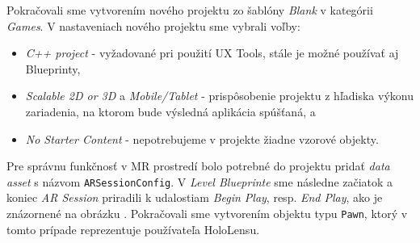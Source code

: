 Pokračovali sme vytvorením nového projektu zo šablóny \emph{Blank} v kategórii \emph{Games}. V nastaveniach nového projektu sme vybrali voľby:
\begin{itemize}
  \item \emph{C++ project} - vyžadované pri použití UX Tools, stále je možné používať aj Blueprinty,
  \item \emph{Scalable 2D or 3D} a \emph{Mobile/Tablet} - prispôsobenie projektu z hľadiska výkonu zariadenia, na ktorom bude výsledná aplikácia spúšťaná, a
  \item \emph{No Starter Content} - nepotrebujeme v projekte žiadne vzorové objekty.
\end{itemize}

Pre správnu funkčnosť v MR prostredí bolo potrebné do projektu pridať \emph{data asset} s názvom \texttt{ARSessionConfig}. V \emph{Level Blueprinte} sme následne začiatok a koniec \emph{AR Session}
priradili k udalostiam \emph{Begin Play}, resp. \emph{End Play}, ako je znázornené na obrázku .
Pokračovali sme vytvorením objektu typu \texttt{Pawn}, ktorý v tomto prípade reprezentuje používateľa HoloLensu. 